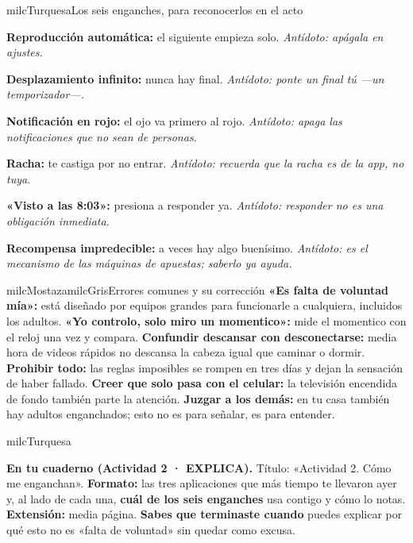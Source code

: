 \documentclass[11pt,letterpaper]{article}
\begin{document}
\begin{drawbox}{milcTurquesa}{Los seis enganches, para reconocerlos en el acto}
\begin{pasoslista}
\item \textbf{Reproducción automática:} el siguiente empieza solo. \emph{Antídoto: apágala en ajustes.}
\item \textbf{Desplazamiento infinito:} nunca hay final. \emph{Antídoto: ponte un final tú ---un temporizador---.}
\item \textbf{Notificación en rojo:} el ojo va primero al rojo. \emph{Antídoto: apaga las notificaciones que no sean de personas.}
\item \textbf{Racha:} te castiga por no entrar. \emph{Antídoto: recuerda que la racha es de la app, no tuya.}
\item \textbf{«Visto a las 8:03»:} presiona a responder ya. \emph{Antídoto: responder no es una obligación inmediata.}
\item \textbf{Recompensa impredecible:} a veces hay algo buenísimo. \emph{Antídoto: es el mecanismo de las máquinas de apuestas; saberlo ya ayuda.}
\end{pasoslista}
\end{drawbox}

\begin{softbox}{milcMostaza}{milcGris}{Errores comunes y su corrección}
\textbf{«Es falta de voluntad mía»:} está diseñado por equipos grandes para funcionarle a cualquiera, incluidos los adultos. \textbf{«Yo controlo, solo miro un momentico»:} mide el momentico con el reloj una vez y compara. \textbf{Confundir descansar con desconectarse:} media hora de videos rápidos no descansa la cabeza igual que caminar o dormir. \textbf{Prohibir todo:} las reglas imposibles se rompen en tres días y dejan la sensación de haber fallado. \textbf{Creer que solo pasa con el celular:} la televisión encendida de fondo también parte la atención. \textbf{Juzgar a los demás:} en tu casa también hay adultos enganchados; esto no es para señalar, es para entender.
\end{softbox}

\begin{infoband}{milcTurquesa}


\textbf{En tu cuaderno (Actividad 2 · EXPLICA).} Título: «Actividad 2. Cómo me enganchan». \textbf{Formato:} las tres aplicaciones que más tiempo te llevaron ayer y, al lado de cada una, \textbf{cuál de los seis enganches} usa contigo y cómo lo notas. \textbf{Extensión:} media página. \textbf{Sabes que terminaste cuando} puedes explicar por qué esto no es «falta de voluntad» sin quedar como excusa.
\end{infoband}
\end{document}
